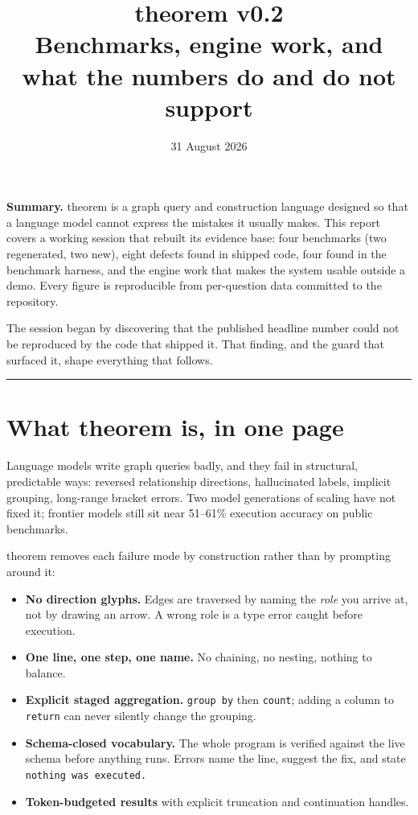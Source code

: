 \documentclass[11pt]{article}
\title{\textbf{theorem v0.2}\\[4pt]
\large Benchmarks, engine work, and what the numbers do and do not support}
\author{}
\date{31 August 2026}
\begin{document}
\maketitle
\vspace{-2.2em}

\begin{center}
\begin{minipage}{0.92\textwidth}
\small
\textbf{Summary.} theorem is a graph query and construction language designed so
that a language model cannot express the mistakes it usually makes. This report
covers a working session that rebuilt its evidence base: four benchmarks (two
regenerated, two new), eight defects found in shipped code, four found in the
benchmark harness, and the engine work that makes the system usable outside a
demo. Every figure is reproducible from per-question data committed to the
repository.

The session began by discovering that the published headline number could not be
reproduced by the code that shipped it. That finding, and the guard that
surfaced it, shape everything that follows.
\end{minipage}
\end{center}

\vspace{1em}
\hrule
\vspace{1em}

\tableofcontents
\newpage

\section{What theorem is, in one page}

Language models write graph queries badly, and they fail in structural,
predictable ways: reversed relationship directions, hallucinated labels,
implicit grouping, long-range bracket errors. Two model generations of scaling
have not fixed it; frontier models still sit near 51--61\% execution accuracy on
public benchmarks.

theorem removes each failure mode by construction rather than by prompting
around it:

\begin{itemize}
  \item \textbf{No direction glyphs.} Edges are traversed by naming the
    \emph{role} you arrive at, not by drawing an arrow. A wrong role is a type
    error caught before execution.
  \item \textbf{One line, one step, one name.} No chaining, no nesting, nothing
    to balance.
  \item \textbf{Explicit staged aggregation.} \texttt{group by} then
    \texttt{count}; adding a column to \texttt{return} can never silently change
    the grouping.
  \item \textbf{Schema-closed vocabulary.} The whole program is verified against
    the live schema before anything runs. Errors name the line, suggest the fix,
    and state \texttt{nothing was executed.}
  \item \textbf{Token-budgeted results} with explicit truncation and
    continuation handles.
\end{itemize}
\end{document}
